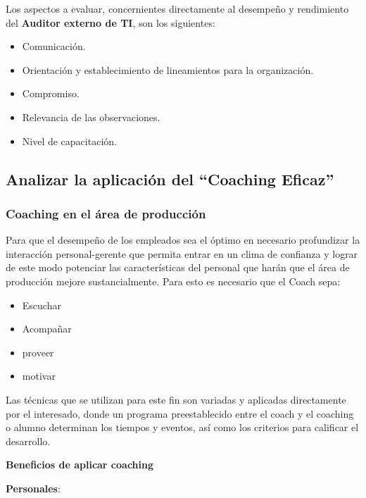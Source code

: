 Los aspectos a evaluar, concernientes directamente al desempeño y rendimiento del \textbf{Auditor externo de TI}, son los siguientes:

\begin{itemize}
    \item Comunicación.
    \item Orientación y establecimiento de lineamientos para la organización.
    \item Compromiso.
    \item Relevancia de las observaciones.
    \item Nivel de capacitación.
\end{itemize}





\newpage

    \subsection{Analizar la aplicación del \textbf{``Coaching Eficaz''} } %
        \subsubsection{Coaching en el área de producción}
		 Para que el desempeño de los empleados sea el óptimo en necesario profundizar la interacción personal-gerente que permita entrar en un clima de confianza y lograr de este modo potenciar las características del personal que harán que el área de producción mejore sustancialmente. Para esto es necesario que el Coach sepa:
        \begin{itemize}
            \item Escuchar
            \item Acompañar
            \item proveer
            \item motivar
        \end{itemize}
Las técnicas que se utilizan para este fin son variadas y aplicadas directamente por el interesado, donde un programa preestablecido entre el coach y el coaching   o alumno determinan los tiempos y eventos, así como los criterios para calificar el desarrollo. 

\textbf{Beneficios de aplicar coaching}

\textbf{Personales}:


